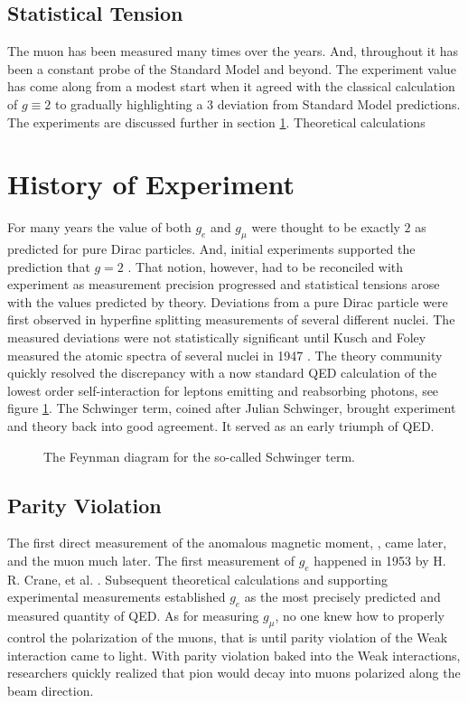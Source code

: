 \subsection{Statistical Tension}

The muon \gmtwo has been measured many times over the years.  And, throughout it has been a constant probe of the Standard Model and beyond.  The experiment value has come along from a modest start when it agreed with the classical calculation of $g\equiv2$ to gradually highlighting a \SI{3}{\sigma} deviation from Standard Model predictions.  The experiments are discussed further in section \ref{sec:history-expt}.  Theoretical calculations 


\section{History of Experiment} \label{sec:history-expt}

For many years the value of both $g_e$ and $g_\mu$ were thought to be exactly $2$ as predicted for pure Dirac particles\cite{the-muon-g-2}. And, initial experiments supported the prediction that $g = 2$ . That notion, however, had to be reconciled with experiment as measurement precision progressed and statistical tensions arose with the values predicted by theory.  Deviations from a pure Dirac particle were first observed in hyperfine splitting measurements of several different nuclei.  The measured deviations were not statistically significant until Kusch and Foley measured the atomic spectra of several nuclei in 1947 \cite{kusch-foley}.  The theory community quickly resolved the discrepancy with a now standard QED calculation of the lowest order self-interaction for leptons emitting and reabsorbing photons, see figure \ref{fig:schwinger-diagram}.  The Schwinger term, coined after Julian Schwinger, brought experiment and theory back into good agreement.  It served as an early triumph of QED. 

\begin{figure}
\centering
{}
\label{fig:schwinger-diagram}
\caption{The Feynman diagram for the so-called Schwinger term.}
\end{figure}

\subsection{Parity Violation}
The first direct measurement of the anomalous magnetic moment, \gmtwo, came later, and the muon \gmtwo much later.  The first measurement of $g_e$ happened in 1953 by H. R. Crane, et al. .  Subsequent theoretical calculations and supporting experimental measurements established $g_e$ as the most precisely predicted and measured quantity of QED.  As for measuring $g_\mu$, no one knew how to properly control the polarization of the muons, that is until parity violation of the Weak interaction came to light.  With parity violation baked into the Weak interactions, researchers quickly realized that pion would decay into muons polarized along the beam direction.  

